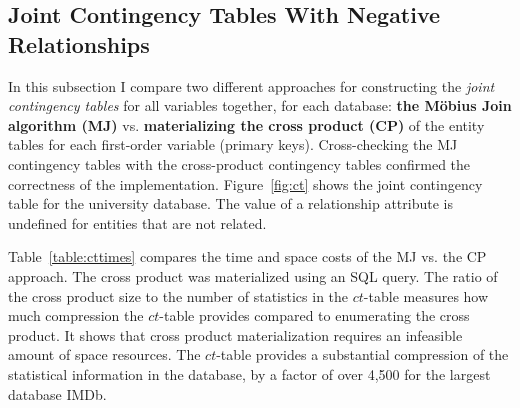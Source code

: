 \documentclass{sfuthesis}
\newcommand{\ct}{\mathit{ct}}
\begin{document}
\subsection{Joint Contingency Tables With Negative Relationships}\label{sec:jct} %
In this subsection I  compare two different approaches for constructing the {\em joint contingency tables} for all variables together, for each database: \textbf{the M\"obius Join algorithm (MJ) } vs. \textbf{materializing the cross product (CP) }of the entity tables for each first-order variable (primary keys).
Cross-checking the MJ contingency tables with the cross-product contingency tables confirmed the correctness of the implementation. 
Figure~\ref{fig:ct} shows the  joint contingency table for the university database. The value of a relationship attribute is undefined for entities that are not related.

Table~\ref{table:cttimes} compares the time and space costs of the MJ vs. the CP approach. The cross product was materialized using an SQL query. 
The ratio of the cross product size to the number of statistics in the $\ct$-table measures how much compression the $\ct$-table provides compared to enumerating the cross product. It shows that cross product materialization  requires an infeasible amount of space resources. The $\ct$-table provides a substantial compression of the statistical information in the database, by a factor of over 4,500 for the largest database IMDb.  
\end{document}
